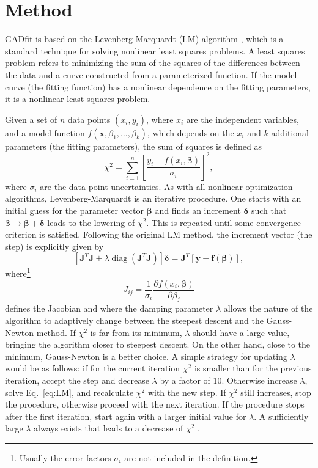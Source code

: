 \documentclass{article}
\DeclareMathOperator{\diag}{diag}
\begin{document}
\section{Method}

GADfit is based on the Levenberg-Marquardt (LM) algorithm \cite{marquardt63}, which is a standard technique for solving nonlinear least squares problems. A least squares problem refers to minimizing the sum of the squares of the differences between the data and a curve constructed from a parameterized function. If the model curve (the fitting function) has a nonlinear dependence on the fitting parameters, it is a nonlinear least squares problem.

Given a set of $n$ data points $(x_i,y_i)$, where $x_i$ are the independent variables, and a model function $f(\bm x, \beta_1, \ldots, \beta_k)$, which depends on the $x_i$ and $k$ additional parameters (the fitting parameters), the sum of squares is defined as
\begin{equation}
  \label{eq:chi2}
  \chi^2 = \sum_{i=1}^n \left[ \frac{y_i - f(x_i, \bm\beta)}{\sigma_i}
  \right]^2,
\end{equation}
where $\sigma_i$ are the data point uncertainties. As with all nonlinear optimization algorithms, Levenberg-Marquardt is an iterative procedure. One starts with an initial guess for the parameter vector $\bm\beta$ and finds an increment $\bm\delta$ such that $\bm\beta \rightarrow \bm\beta + \bm\delta$ leads to the lowering of $\chi^2$. This is repeated until some convergence criterion is satisfied. Following the original LM method, the increment vector (the step) is explicitly given by
\begin{equation}
  \label{eq:LM}
  \left[\bm J^T \bm J + \lambda\diag \left(\bm J^T \bm J\right)
  \right] \bm\delta = \bm J^T \left[ \bm y - \bm f(\bm \beta) \right],
\end{equation}
where\footnote{Usually the error factors $\sigma_i$ are not included in the
  definition.}
\begin{equation}
  \label{eq:Jacob}
  J_{ij} = \frac{1}{\sigma_i} \frac{\partial f(x_i, \bm \beta)}
  {\partial \beta_j}
\end{equation}
defines the Jacobian and where the damping parameter $\lambda$ allows the nature of the algorithm to adaptively change between the steepest descent and the Gauss-Newton method. If $\chi^2$ is far from its minimum, $\lambda$ should have a large value, bringing the algorithm closer to steepest descent. On the other hand, close to the minimum, Gauss-Newton is a better choice. A simple strategy for updating $\lambda$ would be as follows: if for the current iteration $\chi^2$ is smaller than for the previous iteration, accept the step and decrease $\lambda$ by a factor of 10. Otherwise increase $\lambda$, solve Eq.~\eqref{eq:LM}, and recalculate $\chi^2$ with the new step. If $\chi^2$ still increases, stop the procedure, otherwise proceed with the next iteration. If the procedure stops after the first iteration, start again with a larger initial value for $\lambda$. A sufficiently large $\lambda$ always exists that leads to a decrease of $\chi^2$ \cite{marquardt63}.
\end{document}
